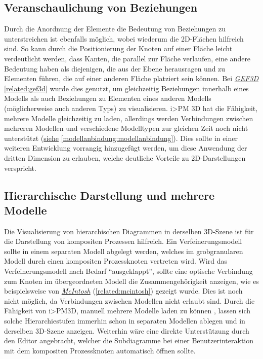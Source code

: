 \documentclass[a4paper,10pt]{sphinxmanual}
\begin{document}
\subsection{Veranschaulichung von Beziehungen}
\label{visualisierung:veranschaulichung-von-beziehungen}
Durch die Anordnung der Elemente die Bedeutung von Beziehungen zu unterstreichen ist ebenfalls möglich, wobei wiederum die 2D-Flächen hilfreich sind.
So kann durch die Positionierung der Knoten auf einer Fläche leicht verdeutlicht werden, dass Kanten, die parallel zur Fläche verlaufen, eine andere Bedeutung haben als diejenigen, die aus der Ebene herausragen und zu Elementen führen, die auf einer anderen Fläche platziert sein können.
Bei {\hyperref[related:gef3d]{\emph{GEF3D}}} \autoref*{related:gef3d} wurde dies genutzt, um gleichzeitig Beziehungen innerhalb eines Modells als auch Beziehungen zu Elementen eines anderen Modells (möglicherweise auch anderen Typs) zu visualisieren.
i\textgreater{}PM 3D hat die Fähigkeit, mehrere Modelle gleichzeitig zu laden, allerdings werden Verbindungen zwischen mehreren Modellen und verschiedene Modelltypen zur gleichen Zeit noch nicht unterstützt ({\hyperref[modellanbindung:modellanbindung]{siehe}} \autoref*{modellanbindung:modellanbindung}).
Dies sollte in einer weiteren Entwicklung vorrangig hinzugefügt werden, um diese Anwendung der dritten Dimension zu erlauben, welche deutliche Vorteile zu 2D-Darstellungen verspricht.


\subsection{Hierarchische Darstellung und mehrere Modelle}
\label{visualisierung:hierarchische-darstellung-und-mehrere-modelle}
Die Visualisierung von hierarchischen Diagrammen in derselben 3D-Szene ist für die Darstellung von kompositen Prozessen hilfreich.
Ein Verfeinerungsmodell sollte in einem separaten Modell abgelegt werden, welches im grobgranularen Modell durch einen kompositen Prozessknoten vertreten wird.
Wird das Verfeinerungsmodell nach Bedarf "`ausgeklappt"', sollte eine optische Verbindung zum Knoten im übergeordneten Modell die Zusammengehörigkeit anzeigen, wie es beispielsweise von {\hyperref[related:mcintosh]{\emph{McIntosh}}} (\autoref*{related:mcintosh}) gezeigt wurde.
Dies ist noch nicht möglich, da Verbindungen zwischen Modellen nicht erlaubt sind.
Durch die Fähigkeit von i\textgreater{}PM3D, manuell mehrere Modelle laden zu können \cite{uli}, lassen sich solche Hierarchiestufen immerhin schon in separaten Modellen ablegen und in derselben 3D-Szene anzeigen.
Weiterhin wäre eine direkte Unterstützung durch den Editor angebracht, welcher die Subdiagramme bei einer Benutzerinteraktion mit dem kompositen Prozessknoten automatisch öffnen sollte.
\end{document}
